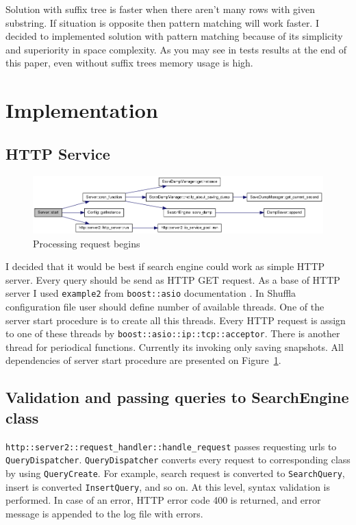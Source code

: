 \documentclass[10pt,a4paper]{article}
\begin{document}
Solution with suffix tree is faster when there aren't many rows with given substring. If situation is opposite then pattern matching will work faster. I decided to implemented solution with pattern matching because of its simplicity and superiority in space complexity. As you may see in tests results at the end of this paper, even without suffix trees memory usage is high. 

\section{Implementation}

\subsection{HTTP Service}

\begin{figure}
\centering
  \includegraphics[width=16cm]{start}
  \caption{Processing request begins}
  \label{fig:httpservice}
\end{figure}

I decided that it would be best if search engine could work as simple HTTP server. Every query should be send as HTTP GET request. As a base of HTTP server I used \verb|example2| from \verb|boost::asio| documentation \cite{ASIOHTTP}. In Shuffla configuration file user should define number of available threads. One of the server start procedure is to create all this threads. Every HTTP request is assign to one of these threads by \verb|boost::asio::ip::tcp::acceptor|. There is another thread for periodical functions. Currently its invoking only saving snapshots. All dependencies of server start procedure are presented on Figure~\ref{fig:httpservice}.

\subsection{Validation and passing queries to SearchEngine class}

\verb|http::server2::request_handler::handle_request| passes requesting urls to \verb|QueryDispatcher|. \verb|QueryDispatcher| converts every request to corresponding class by using \verb|QueryCreate|. For example, search request is converted to \verb|SearchQuery|, insert is converted \verb|InsertQuery|, and so on. At this level, syntax validation is performed. In case of an error, HTTP error code 400 is returned, and error message is appended to the log file with errors. 
\end{document}
